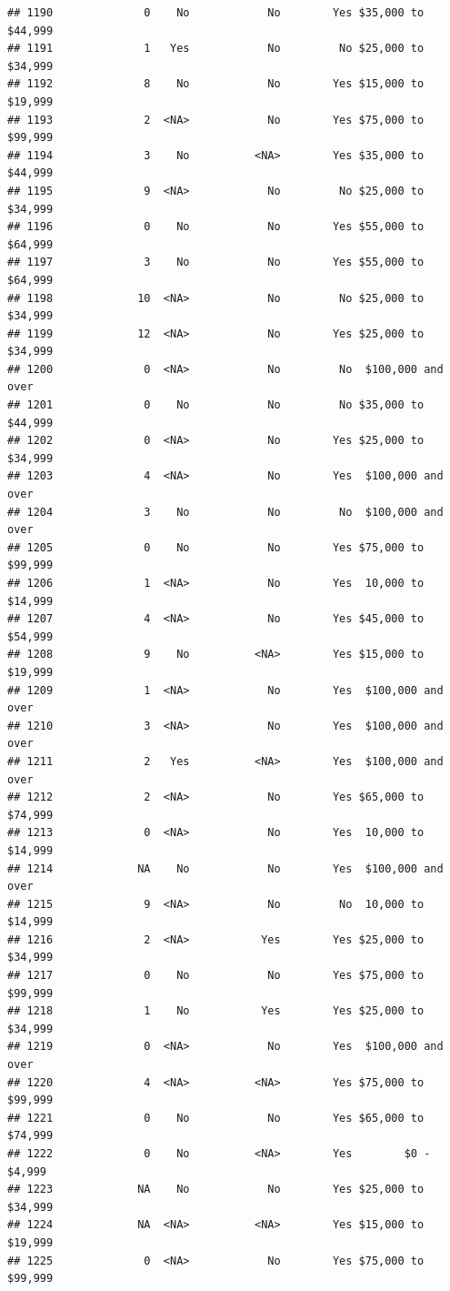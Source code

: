 \documentclass[man]{apa6}
\begin{document}
\begin{verbatim}
## 1190              0    No            No        Yes $35,000 to $44,999
## 1191              1   Yes            No         No $25,000 to $34,999
## 1192              8    No            No        Yes $15,000 to $19,999
## 1193              2  <NA>            No        Yes $75,000 to $99,999
## 1194              3    No          <NA>        Yes $35,000 to $44,999
## 1195              9  <NA>            No         No $25,000 to $34,999
## 1196              0    No            No        Yes $55,000 to $64,999
## 1197              3    No            No        Yes $55,000 to $64,999
## 1198             10  <NA>            No         No $25,000 to $34,999
## 1199             12  <NA>            No        Yes $25,000 to $34,999
## 1200              0  <NA>            No         No  $100,000 and over
## 1201              0    No            No         No $35,000 to $44,999
## 1202              0  <NA>            No        Yes $25,000 to $34,999
## 1203              4  <NA>            No        Yes  $100,000 and over
## 1204              3    No            No         No  $100,000 and over
## 1205              0    No            No        Yes $75,000 to $99,999
## 1206              1  <NA>            No        Yes  10,000 to $14,999
## 1207              4  <NA>            No        Yes $45,000 to $54,999
## 1208              9    No          <NA>        Yes $15,000 to $19,999
## 1209              1  <NA>            No        Yes  $100,000 and over
## 1210              3  <NA>            No        Yes  $100,000 and over
## 1211              2   Yes          <NA>        Yes  $100,000 and over
## 1212              2  <NA>            No        Yes $65,000 to $74,999
## 1213              0  <NA>            No        Yes  10,000 to $14,999
## 1214             NA    No            No        Yes  $100,000 and over
## 1215              9  <NA>            No         No  10,000 to $14,999
## 1216              2  <NA>           Yes        Yes $25,000 to $34,999
## 1217              0    No            No        Yes $75,000 to $99,999
## 1218              1    No           Yes        Yes $25,000 to $34,999
## 1219              0  <NA>            No        Yes  $100,000 and over
## 1220              4  <NA>          <NA>        Yes $75,000 to $99,999
## 1221              0    No            No        Yes $65,000 to $74,999
## 1222              0    No          <NA>        Yes        $0 - $4,999
## 1223             NA    No            No        Yes $25,000 to $34,999
## 1224             NA  <NA>          <NA>        Yes $15,000 to $19,999
## 1225              0  <NA>            No        Yes $75,000 to $99,999

\end{verbatim}
\end{document}
